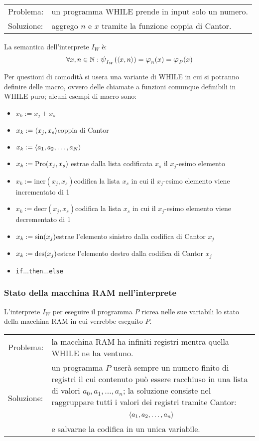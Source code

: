 \begin{tabular}{l p{}}
    Problema:& un programma WHILE prende in input solo un numero.\\[.5em]
    Soluzione:& aggrego $n$ e $x$ tramite la funzione coppia di Cantor.
\end{tabular}
\begin{figure}[h]
    \centering
    
\end{figure}

La semantica dell'interprete $I_W$ è:
$$\forall x,n\in\N: \semWHILE_{I_W}(\cantor{x,n})
=\semRAM_n(x)=\semRAM_P(x)$$

Per questioni di comodità si usera una variante di WHILE in cui si potranno definire
delle macro, ovvero delle chiamate a funzioni comunque definibili in WHILE puro; alcuni
esempi di macro sono:
\begin{itemize}
    \item $x_k:=x_j+x_s$
    \item $x_k:=\langle x_j,x_s\rangle$\hfill coppia di Cantor
    \item $x_k:=\langle a_1,a_2,\dots,a_N\rangle$\hfill {}
    \item $x_k:=\text{Pro}(x_j,x_s)$ \hfill estrae dalla lista codificata $x_s$ il
        $x_j$-esimo elemento
    \item $x_k:=\text{incr}(x_j,x_s)$\hfill codifica la lista $x_s$ in cui il $x_j$-esimo elemento
        viene incrementato di 1
    \item $x_k:=\text{decr}(x_j,x_s)$\hfill codifica la lista $x_s$ in cui il $x_j$-esimo elemento
    viene decrementato di 1
    \item $x_k:=\text{sin}(x_j)$\hfill estrae l'elemento sinistro dalla codifica di Cantor $x_j$
    \item $x_k:=\text{des}(x_j)$\hfill estrae l'elemento destro dalla codifica di Cantor $x_j$
    \item \texttt{if}$\dots$\texttt{then}$\dots$\texttt{else}
\end{itemize}

\subsubsection*{Stato della macchina RAM nell'interprete}
L'interprete $I_W$ per eseguire il programma $P$ ricrea nelle sue variabili lo stato
della macchina RAM in cui verrebbe eseguito $P$.

\begin{tabular}{l p{}}
    Problema:& la macchina RAM ha infiniti registri mentra quella WHILE ne ha ventuno.
        \\[.5em]
    Soluzione:& un programma $P$ userà sempre un numero finito di registri il cui contenuto
        può essere racchiuso in una lista di valori $a_0,a_1,\dots,a_n$; la soluzione
        consiste nel raggruppare tutti i valori dei registri tramite Cantor:
        $$ \langle a_1,a_2,\dots,a_n\rangle $$ e salvarne la codifica in un unica variabile.
\end{tabular}


